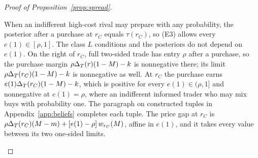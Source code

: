 \begin{proof}[Proof of Proposition~\ref{prop:spread}]
\begin{enumerate}[label=(\roman*),leftmargin=2em]
\begin{enumerate}[label=(\alph*),leftmargin=2em]
When an indifferent high-cost rival may prepare with any probability, the posterior after a purchase at \(r_C\)
equals \(\tau(r_C)\), so (E3) allows every \(e(1)\in[\rho,1]\). The class \(L\) conditions and the posteriors do not
depend on \(e(1)\). On the right of \(r_C\), full two-sided trade has entry \(\rho\) after a purchase, so the purchase
margin \(\rho\Delta_T(r)(1-M)-k\) is nonnegative there; its limit \(\rho\Delta_T(r_C)(1-M)-k\) is nonnegative as well. At \(r_C\)
the purchase earns \(e(1)\Delta_T(r_C)(1-M)-k\), which is positive for every \(e(1)\in(\rho,1]\) and nonnegative at
\(e(1)=\rho\), where an indifferent informed trader who may mix buys with probability one. The paragraph on constructed tuples
in Appendix~\ref{app:beliefs} completes each tuple. The price gap at \(r_C\) is
\(\rho\Delta_T(r_C)(M-m)+[e(1)-\rho]\,w_{r_C}(M)\), affine in \(e(1)\), and it takes every value between its two
one-sided limits.\qedhere
\end{enumerate}
\end{enumerate}
\end{proof}

